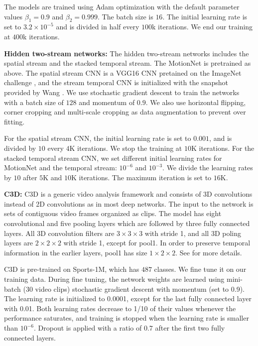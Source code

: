 \documentclass[sigconf]{acmart}
\begin{document}
	The models are trained using Adam optimization with the default parameter values $\beta_{1}=0.9$ and $\beta_{2}=0.999$. The batch size is $16$. The initial learning rate is set to $3.2\times10^{-5}$ and is divided in half every $100$k iterations. We end our training at $400$k iterations.
	
	\noindent \textbf{Hidden two-stream networks:} 
	The hidden two-stream networks includes the spatial stream and the stacked temporal stream. The MotionNet is pretrained as above. The spatial stream CNN is a VGG16 CNN pretained on the ImageNet challenge \cite{imagenet_cvpr09}, and the stream temporal CNN is initialized with the snapshot provided by Wang \cite{wanggoodpractice2015}. We use stochastic gradient descent to train the networks with a batch size of $128$ and momentum of $0.9$.  We also use horizontal flipping, corner cropping and multi-scale cropping as data augmentation to prevent over fitting.
	
	For the spatial stream CNN, the initial learning rate is set to $0.001$, and is divided by $10$ every $4$K iterations. We stop the training at $10$K iterations. 
	For the stacked temporal stream CNN, we set different initial learning rates for MotionNet and the temporal stream: $10^{-6}$ and $10^{-3}$. We divide the learning rates by $10$ after $5$K and $10$K iterations. The maximum iteration is set to $16$K.
	
	\noindent \textbf{C3D:} 
	C3D \cite{c3d2015} is a generic video analysis framework and consists of 3D convolutions instead of 2D convolutions as in most deep networks. The input to the network is sets of contiguous video frames organized as clips. The model has eight convolutional and five pooling layers which are followed by three fully connected layers. All 3D convolution filters are $3 \times 3 \times 3$ with stride 1, and all 3D poling layers are $2\times2\times2$ with stride 1, except for pool1. In order to preserve temporal information in the earlier layers, pool1 has size $1 \times 2 \times 2$. See \cite{c3d2015} for more details.
	
	C3D is pre-trained on Sports-1M, which has $487$ classes. We fine tune it on our training data. During fine tuning, the network weights are learned using mini-batch (30 video clips) stochastic gradient descent with momentum (set to 0.9). The learning rate is initialized to 0.0001, except for the last fully connected layer with 0.01. Both learning rates decrease to 1/10 of their values whenever the performance saturates, and training is stopped when the learning rate is smaller than $10^{-6}$. Dropout is applied with a ratio of $0.7$ after the first two fully connected layers.
	
\end{document}
